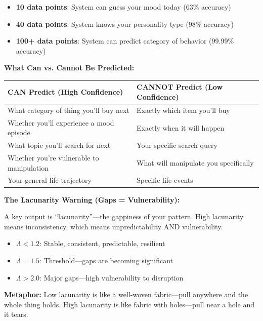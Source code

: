 \documentclass[11pt,twoside]{book}
\renewcommand{\arraystretch}{1.2}
\newcommand{\Lacunarity}{\Lambda}
\begin{document}
\begin{tcolorbox}[colback=green!5!white,colframe=green!65!black,title=\textbf{Plain English: Understanding TKS Predictive Intelligence},breakable]
\begin{itemize}
    \item \textbf{10 data points}: System can guess your mood today (63\% accuracy)
    \item \textbf{40 data points}: System knows your personality type (98\% accuracy)
    \item \textbf{100+ data points}: System can predict category of behavior (99.99\% accuracy)
\end{itemize}

\textbf{What Can vs. Cannot Be Predicted:}

\begin{center}
\footnotesize
\renewcommand{\arraystretch}{1.3}
\begin{tabularx}{\textwidth}{X|X}
\toprule
\textbf{CAN Predict (High Confidence)} & \textbf{CANNOT Predict (Low Confidence)} \\
\midrule
What category of thing you'll buy next & Exactly which item you'll buy \\
Whether you'll experience a mood episode & Exactly when it will happen \\
What topic you'll search for next & Your specific search query \\
Whether you're vulnerable to manipulation & What will manipulate you specifically \\
Your general life trajectory & Specific life events \\
\bottomrule
\end{tabularx}
\end{center}

\bigskip

\textbf{The Lacunarity Warning (Gaps = Vulnerability):}

A key output is ``lacunarity''---the gappiness of your pattern. High lacunarity means inconsistency, which means unpredictability AND vulnerability.

\begin{itemize}
    \item $\Lacunarity < 1.2$: Stable, consistent, predictable, resilient
    \item $\Lacunarity = 1.5$: Threshold---gaps are becoming significant
    \item $\Lacunarity > 2.0$: Major gaps---high vulnerability to disruption
\end{itemize}

\textbf{Metaphor:} Low lacunarity is like a well-woven fabric---pull anywhere and the whole thing holds. High lacunarity is like fabric with holes---pull near a hole and it tears.

\end{tcolorbox}
\end{document}
